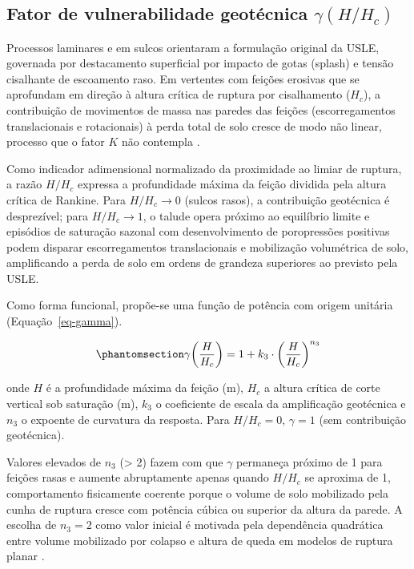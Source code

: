 \documentclass[
  brazilian,
  authoryear,
  preprint]{elsarticle}
\begin{document}
\subsection{\texorpdfstring{Fator de vulnerabilidade geotécnica
\(\gamma(H/H_c)\)}{Fator de vulnerabilidade geotécnica \textbackslash gamma(H/H\_c)}}\label{fator-de-vulnerabilidade-geotuxe9cnica-gammahh_c}

Processos laminares e em sulcos orientaram a formulação original da
USLE, governada por destacamento superficial por impacto de gotas
(splash) e tensão cisalhante de escoamento raso. Em vertentes com
feições erosivas que se aprofundam em direção à altura crítica de
ruptura por cisalhamento (\(H_c\)), a contribuição de movimentos de
massa nas paredes das feições (escorregamentos translacionais e
rotacionais) à perda total de solo cresce de modo não linear, processo
que o fator \(K\) não contempla
\citep{poesen_et_al_2003, sidorchuk_2006}.

Como indicador adimensional normalizado da proximidade ao limiar de
ruptura, a razão \(H/H_c\) expressa a profundidade máxima da feição
dividida pela altura crítica de Rankine. Para \(H/H_c \to 0\) (sulcos
rasos), a contribuição geotécnica é desprezível; para \(H/H_c \to 1\), o
talude opera próximo ao equilíbrio limite e episódios de saturação
sazonal com desenvolvimento de poropressões positivas podem disparar
escorregamentos translacionais e mobilização volumétrica de solo,
amplificando a perda de solo em ordens de grandeza superiores ao
previsto pela USLE.

Como forma funcional, propõe-se uma função de potência com origem
unitária (Equação~\ref{eq-gamma}).

\begin{equation}\phantomsection\label{eq-gamma}{
\gamma\!\left(\dfrac{H}{H_c}\right) = 1 + k_3 \cdot \left(\dfrac{H}{H_c}\right)^{n_3}
}\end{equation}

onde \(H\) é a profundidade máxima da feição (m), \(H_c\) a altura
crítica de corte vertical sob saturação (m), \(k_3\) o coeficiente de
escala da amplificação geotécnica e \(n_3\) o expoente de curvatura da
resposta. Para \(H/H_c = 0\), \(\gamma = 1\) (sem contribuição
geotécnica).

Valores elevados de \(n_3\) (\textgreater{} 2) fazem com que \(\gamma\)
permaneça próximo de 1 para feições rasas e aumente abruptamente apenas
quando \(H/H_c\) se aproxima de 1, comportamento fisicamente coerente
porque o volume de solo mobilizado pela cunha de ruptura cresce com
potência cúbica ou superior da altura da parede. A escolha de
\(n_3 = 2\) como valor inicial é motivada pela dependência quadrática
entre volume mobilizado por colapso e altura de queda em modelos de
ruptura planar \citep{fredlund_rahardjo_1993}.
\end{document}
